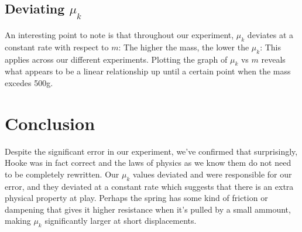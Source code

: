 \documentclass[12pt]{article}
\begin{document}
        \subsection{Deviating $\mu_k$}
            An interesting point to note is that throughout our experiment, $\mu_k$
            deviates at a constant rate with respect to $m$: The higher the mass,
            the lower the $\mu_k$: This applies across our different experiments.
            Plotting the graph of $\mu_k$ vs $m$ reveals what appears to be a linear
            relationship up until a certain point when the mass excedes 500g.
    \section{Conclusion}
        Despite the significant error in our experiment, we've confirmed that
        surprisingly, Hooke was in fact correct and the laws of physics as we
        know them do not need to be completely rewritten. Our $\mu_k$ values
        deviated and were responsible for our error, and they deviated at a
        constant rate which suggests that there is an extra physical property at
        play. Perhaps the spring has some kind of friction or dampening that gives
        it higher resistance when it's pulled by a small ammount, making $\mu_k$
        significantly larger at short displacements.
\end{document}
